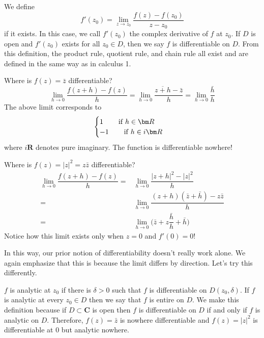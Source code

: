\vspace{2ex}
\begin{defi}
We define
\[f'(z_0)=\lim _{z\rightarrow z_0}\dfrac{f(z)-f(z_0)}{z-z_0}\]
if it exists. In this case, we call $f'(z_0)$ the complex derivative of $f$ at $z_0$. If $D$ is open and $f'(z_0)$ exists for all $z_0\in D$, then we say $f$ is differentiable on $D$. From this definition, the product rule, quotient rule, and chain rule all exist and are defined in the same way as in calculus 1.
\end{defi}
\vspace{2ex}
\begin{ex}
Where is $f(z)=\bar{z}$ differentiable?
\[\lim_{h\rightarrow 0}\dfrac{f(z+h)-f(z)}{h}=\lim _{h\rightarrow 0}\dfrac{\overline{z+h}-\bar{z}}{h}=\lim _{h\rightarrow 0} \dfrac{\bar{h}}{h}\]
The above limit corresponds to
\[\begin{cases}
1\hspace{5ex}\mathrm{if}\;h\in {\bm R}\\
-1\hspace{5ex}\mathrm{if}\;h\in i{\bm R}
\end{cases}\]
where $i{\bm R}$ denotes pure imaginary. The function is differentiable nowhere!
\end{ex}
\vspace{2ex}
\begin{ex}
Where is $f(z)=|z|^2=z\bar{z}$ differentiable?
\begin{align*}
	\lim_{h\rightarrow 0}\dfrac{f(z+h)-f(z)}{h}=&\lim _{h\rightarrow 0}\dfrac{|z+h|^2-|z|^2}{h}\\=&\lim _{h\rightarrow 0}\dfrac{(z+h)(\bar{z}+\bar{h})-z\bar{z}}{h}\\=&\lim _{h\rightarrow 0}\Big(\bar{z}+z\dfrac{\bar{h}}{h}+\bar{h}\Big) 
\end{align*}
Notice how this limit exists only when $z=0$ and $f'(0)=0$!
\end{ex}
\vspace{2ex}
In this way, our prior notion of differentiability doesn't really work alone. We again emphasize that this is because the limit differs by direction. Let's try this differently.
\\
\begin{defi}
$f$ is analytic at $z_0$ if there is $\delta >0$ such that $f$ is differentiable on $D(z_0,\delta )$. If $f$ is analytic at every $z_0\in D$ then we say that $f$ is entire on $D$. We make this definition because if $D\subset {\bm C}$ is open then $f$ is differentiable on $D$ if and only if $f$ is analytic on $D$. Therefore, $f(z)=\bar{z}$ is nowhere differentiable and $f(z)=|z|^2$ is differentiable at $0$ but analytic nowhere. 
\end{defi}
